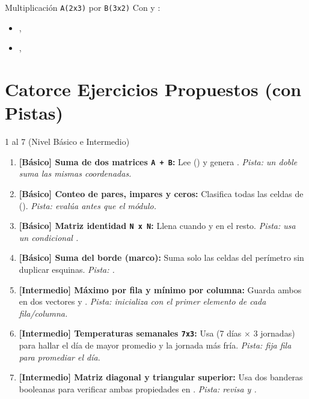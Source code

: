 \documentclass[11pt,letterpaper]{article}
\begin{document}
\begin{pruebaescritorio}{Multiplicación \texttt{A(2x3)} por \texttt{B(3x2)}}
Con  y :
\begin{itemize}
  \item {}, 
  \item {}, 
\end{itemize}
\end{pruebaescritorio}

\section{Catorce Ejercicios Propuestos (con Pistas)}

\begin{ejercicio}{1 al 7 (Nivel Básico e Intermedio)}
\begin{enumerate}
  \item \textbf{[Básico] Suma de dos matrices \texttt{A + B}:} Lee  () y genera . \emph{Pista: un doble  suma las mismas coordenadas.}
  \item \textbf{[Básico] Conteo de pares, impares y ceros:} Clasifica todas las celdas de  (). \emph{Pista: evalúa  antes que el módulo.}
  \item \textbf{[Básico] Matriz identidad \texttt{N x N}:} Llena  cuando  y  en el resto. \emph{Pista: usa un condicional .}
  \item \textbf{[Básico] Suma del borde (marco):} Suma solo las celdas del perímetro sin duplicar esquinas. \emph{Pista: .}
  \item \textbf{[Intermedio] Máximo por fila y mínimo por columna:} Guarda ambos en dos vectores  y . \emph{Pista: inicializa con el primer elemento de cada fila/columna.}
  \item \textbf{[Intermedio] Temperaturas semanales \texttt{7x3}:} Usa  (7 días $\times$ 3 jornadas) para hallar el día de mayor promedio y la jornada más fría. \emph{Pista: fija fila para promediar el día.}
  \item \textbf{[Intermedio] Matriz diagonal y triangular superior:} Usa dos banderas booleanas para verificar ambas propiedades en . \emph{Pista: revisa  y .}
\end{enumerate}
\end{ejercicio}
\end{document}
